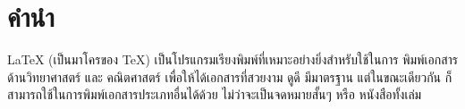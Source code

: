 %

\chapter{คำนำ}

\LaTeX{} (เป็นมาโครของ \TeX) เป็นโปรแกรมเรียงพิมพ์ที่เหมาะอย่างยิ่งสำหรับใช้ในการ%
พิมพ์เอกสารด้านวิทยาศาสตร์ และ คณิตศาสตร์ เพื่อให้ได้เอกสารที่สวยงาม ดูดี มีมาตรฐาน
แต่ในขณะเดียวกัน ก็สามารถใช้ในการพิมพ์เอกสารประเภทอื่นได้ด้วย ไม่ว่าจะเป็นจดหมายสั้นๆ
หรือ หนังสือทั้งเล่ม 

\shbtoaddmoretranslation
